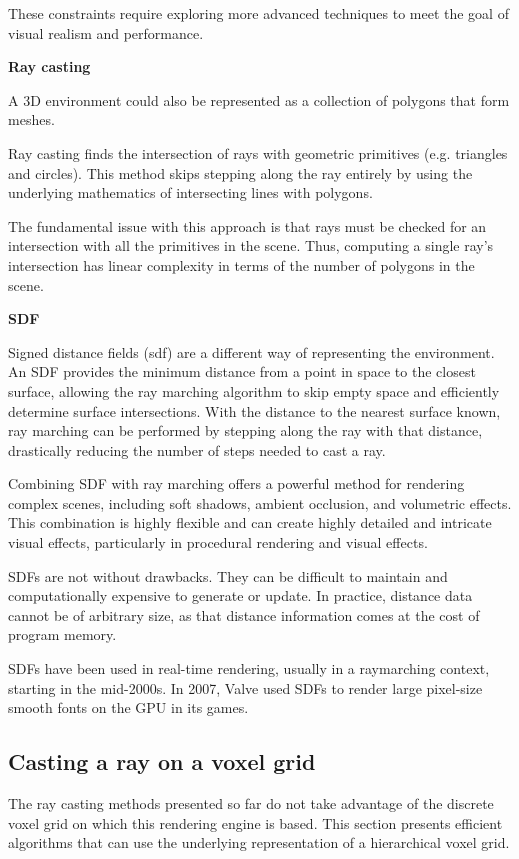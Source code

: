 These constraints require exploring more advanced techniques to meet the goal of visual realism and performance.

\vspace{0.5cm}
\textbf{Ray casting}

A 3D environment could also be represented as a collection of polygons that form meshes.

Ray casting finds the intersection of rays with geometric primitives (e.g. triangles and circles). This method skips stepping along the ray entirely by using the underlying mathematics of intersecting lines with polygons.

The fundamental issue with this approach is that rays must be checked for an intersection with all the primitives in the scene. Thus, computing a single ray's intersection has linear complexity in terms of the number of polygons in the scene.


\vspace{0.5cm}
\label{def:sdf}
\textbf{SDF}

Signed distance fields (\acrshort{sdf}) are a different way of representing the environment. An SDF provides the minimum distance from a point in space to the closest surface, allowing the ray marching algorithm to skip empty space and efficiently determine surface intersections.
With the distance to the nearest surface known, ray marching can be performed by stepping along the ray with that distance, drastically reducing the number of steps needed to cast a ray.

Combining SDF with ray marching offers a powerful method for rendering complex scenes, including soft shadows, ambient occlusion, and volumetric effects.
This combination is highly flexible and can create highly detailed and intricate visual effects, particularly in procedural rendering and visual effects.

SDFs are not without drawbacks. They can be difficult to maintain and computationally expensive to generate or update. In practice, distance data cannot be of arbitrary size, as that distance information comes at the cost of program memory.

SDFs have been used in real-time rendering, usually in a raymarching context, starting in the mid-2000s. In 2007, Valve used SDFs to render large pixel-size smooth fonts on the GPU in its games\supercite{valve}.

\subsection{Casting a ray on a voxel grid}
The ray casting methods presented so far do not take advantage of the discrete voxel grid on which this rendering engine is based. This section presents efficient algorithms that can use the underlying representation of a hierarchical voxel grid.

